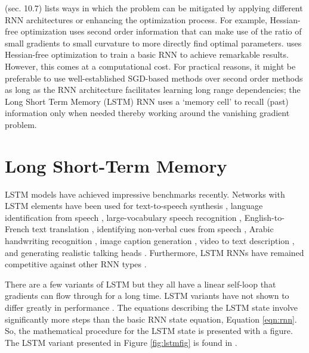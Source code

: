 \cite{Bengio-et-al-2015-Book} (sec. 10.7) lists ways in which the problem can be mitigated by applying different RNN architectures or enhancing the optimization process.
%
For example, Hessian-free optimization \cite{Martens2010} uses second order information that can make use of the ratio of small gradients to small curvature to more directly find optimal parameters.
%
\cite{Martens2011} uses Hessian-free optimization to train a basic RNN to achieve remarkable results.
%
However, this comes at a computational cost.
%
For practical reasons, it might be preferable to use well-established SGD-based methods over second order methods \cite{Bengio2012,Dauphin} as long as the RNN architecture facilitates learning long range dependencies;
%
the Long Short Term Memory (LSTM) RNN \cite{Hochreiter1997} uses a `memory cell' to recall (past) information only when needed thereby working around the vanishing gradient problem.




\section{Long Short-Term Memory} %

LSTM models have achieved impressive benchmarks recently.
%
Networks with LSTM elements have been used for
text-to-speech synthesis \cite{Fan2014},
language identification from speech \cite{Gonzalez-Dominguez2014},
large-vocabulary speech recognition \cite{Sak2014},
English-to-French text translation  \cite{Sutskever2014},
identifying non-verbal cues from speech \cite{Brueckner2014},
Arabic handwriting recognition \cite{Bluche},
image caption generation \cite{Vinyals2015},
video to text description \cite{Venugopalan2014},
and generating realistic talking heads \cite{Fan2015}.
%
Furthermore, LSTM RNNs have remained competitive against other RNN types \cite{Jozefowicz2015}.


There are a few variants of LSTM but they all have a linear self-loop that gradients can flow through for a long time.
%
LSTM variants have not shown to differ greatly in performance \cite{Greff2015}.
%
The equations describing the LSTM state involve significantly more steps than the basic RNN state equation, Equation \ref{eqn:rnn}.
%
So, the mathematical procedure for the LSTM state is presented with a figure.
%
The LSTM variant presented in Figure \ref{fig:lstmfig} is found in \cite{Graves2013b}.

